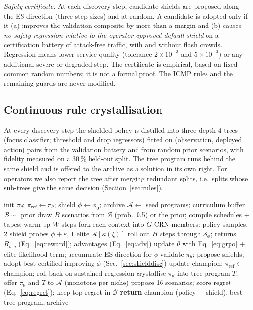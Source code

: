 \emph{Safety certificate.} At each discovery step, candidate shields are
proposed along the ES direction (three step sizes) and at random. A candidate
is adopted only if it (a) improves the validation composite by more than a
margin and (b) causes \emph{no safety regression relative to the
operator-approved default shield} on a certification battery of attack-free
traffic, with and without flash crowds. Regression means lower service quality
(tolerance $2\times10^{-3}$ and $5\times10^{-3}$) or any additional severe or
degraded step. The certificate is empirical, based on fixed common random
numbers; it is not a formal proof. The ICMP rules and the remaining guards are
never modified.

\subsection{Continuous rule crystallisation}
\label{sec:crystal}
At every discovery step the shielded policy is distilled into three depth-4
trees (focus classifier; threshold and drop regressors) fitted on
(observation, deployed action) pairs from the validation battery and from
random prior scenarios, with fidelity measured on a 30\,\% held-out split. The
tree program runs behind the same shield and is offered to the archive as a
solution in its own right. For operators we also report the tree after merging
redundant splits, i.e.\ splits whose sub-trees give the same decision
(Section~\ref{sec:rules}).

\begin{algorithm}[t]
\caption{NS-CSD training loop (one seed)}
\label{alg:nscsd}
\small
\begin{algorithmic}[1]
\STATE init $\pi_\theta$; $\pi_{\text{ref}}\!\leftarrow\!\pi_\theta$; shield $\phi\!\leftarrow\!\phi_0$; archive $\mathcal{A}\!\leftarrow$ seed programs; curriculum buffer $\mathcal{B}\!\sim$ prior
  \STATE draw $B$ scenarios from $\mathcal{B}$ (prob.\ 0.5) or the prior; compile schedules + tapes; warm up $W$ steps
  \STATE fork each context into $G$ CRN members: policy samples, 2 shield probes $\phi+\varepsilon$, 1 elite $\mathcal{A}[\kappa(\xi)]$
  \STATE roll out $H$ steps through $\mathcal{S}_\phi$; returns $R_{b,g}$ (Eq.~\ref{eq:reward}); advantages (Eq.~\ref{eq:adv})
  \STATE update $\theta$ with Eq.~\eqref{eq:grpo} + elite likelihood term; accumulate ES direction for $\phi$
    \STATE validate $\pi_\theta$; propose shields; adopt best certified improving $\phi$ (Sec.~\ref{sec:shielddisc})
    \STATE update champion; $\pi_{\text{ref}}\!\leftarrow$ champion; roll back on sustained regression
    \STATE crystallise $\pi_\theta$ into tree program $T$; offer $\pi_\theta$ and $T$ to $\mathcal{A}$ (monotone per niche)
    \STATE propose 16 scenarios; score regret (Eq.~\ref{eq:regret}); keep top-regret in $\mathcal{B}$
  \ENDIF
\ENDFOR
\STATE \textbf{return} champion (policy + shield), best tree program, archive
\end{algorithmic}
\end{algorithm}
